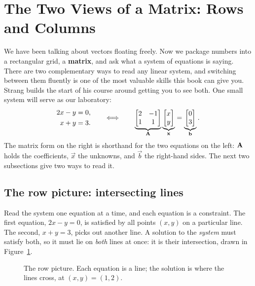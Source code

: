 \section{The Two Views of a Matrix: Rows and Columns}

We have been talking about vectors floating freely. Now we package
numbers into a rectangular grid, a \textbf{matrix}, and ask what a system of equations is saying. There
are two complementary ways to read any linear system, and switching between them fluently is one of
the most valuable skills this book can give you. Strang builds the start of his course around getting
you to see both. One small system will serve as our laboratory:
\[
\begin{aligned}
2x - y &= 0,\\
x + y &= 3.
\end{aligned}
\qquad\Longleftrightarrow\qquad
\underbrace{\begin{bmatrix} 2 & -1 \\ 1 & 1 \end{bmatrix}}_{\mathbf{A}}
\underbrace{\begin{bmatrix}x\\y\end{bmatrix}}_{\mathbf{x}}
=
\underbrace{\begin{bmatrix}0\\3\end{bmatrix}}_{\mathbf{b}}.
\]
The matrix form on the right is shorthand for the two equations on the left: $\mathbf{A}$ holds the
coefficients, $\vec x$ the unknowns, and $\vec b$ the right-hand sides. The next two subsections give
two ways to read it.

\subsection{The row picture: intersecting lines}

Read the system one equation at a time, and each equation is a constraint. The first equation,
$2x - y = 0$, is satisfied by all points $(x,y)$ on a particular line. The second, $x + y = 3$, picks
out another line. A solution to the \emph{system} must satisfy both, so it must lie on \emph{both}
lines at once: it is their intersection, drawn in Figure~\ref{ch01:rowpic}.

\begin{figure}[H]
\centering
{}
\caption{The row picture. Each equation is a line; the solution is where the lines cross, at
$(x,y)=(1,2)$.}
\label{ch01:rowpic}
\end{figure}


